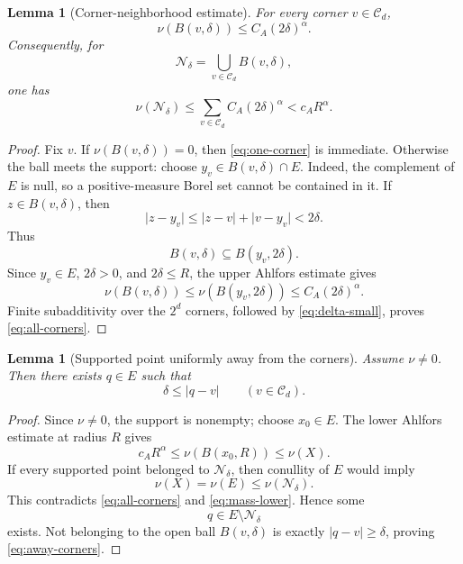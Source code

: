 \documentclass[11pt]{article}
\newtheorem{lemma}[theorem]{Lemma}
\theoremstyle{remark}
\newcommand{\Corners}{\mathcal C_d}
\begin{document}
\begin{lemma}[Corner-neighborhood estimate]                               \label{lem:corner-neighborhood}
For every corner \(v\in\Corners\),
\begin{equation}
  \nu(B(v,\delta))
  \leq
  C_A(2\delta)^\alpha.                                                     \label{eq:one-corner}
\end{equation}
Consequently, for
\[
  \mathcal N_\delta
  =
  \bigcup_{v\in\Corners}B(v,\delta),
\]
one has
\begin{equation}
  \nu(\mathcal N_\delta)
  \leq
  \sum_{v\in\Corners}C_A(2\delta)^\alpha
  <
  c_A R^\alpha.                                                           \label{eq:all-corners}
\end{equation}
\end{lemma}

\begin{proof}
Fix \(v\).  If \(\nu(B(v,\delta))=0\), then
\eqref{eq:one-corner} is immediate.  Otherwise the ball meets the support:
choose \(y_v\in B(v,\delta)\cap E\).  Indeed, the complement of \(E\) is
null, so a positive-measure Borel set cannot be contained in it.  If
\(z\in B(v,\delta)\), then
\[
  \lvert z-y_v\rvert
  \leq
  \lvert z-v\rvert+\lvert v-y_v\rvert
  <
  2\delta.
\]
Thus
\[
  B(v,\delta)\subseteq B(y_v,2\delta).
\]
Since \(y_v\in E\), \(2\delta>0\), and \(2\delta\leq R\), the upper
Ahlfors estimate gives
\[
  \nu(B(v,\delta))
  \leq
  \nu(B(y_v,2\delta))
  \leq
  C_A(2\delta)^\alpha.
\]
Finite subadditivity over the \(2^d\) corners, followed by
\eqref{eq:delta-small}, proves \eqref{eq:all-corners}.
\end{proof}

\begin{lemma}[Supported point uniformly away from the corners]            \label{lem:away-point}
Assume \(\nu\neq0\).  Then there exists \(q\in E\) such that
\begin{equation}
  \delta\leq\lvert q-v\rvert
  \qquad(v\in\Corners).                                                    \label{eq:away-corners}
\end{equation}
\end{lemma}

\begin{proof}
Since \(\nu\neq0\), the support is nonempty; choose \(x_0\in E\).  The
lower Ahlfors estimate at radius \(R\) gives
\begin{equation}
  c_A R^\alpha
  \leq
  \nu(B(x_0,R))
  \leq
  \nu(X).                                                                 \label{eq:mass-lower}
\end{equation}
If every supported point belonged to \(\mathcal N_\delta\), then conullity
of \(E\) would imply
\[
  \nu(X)=\nu(E)\leq\nu(\mathcal N_\delta).
\]
This contradicts \eqref{eq:all-corners} and
\eqref{eq:mass-lower}.  Hence some
\[
  q\in E\setminus\mathcal N_\delta
\]
exists.  Not belonging to the open ball \(B(v,\delta)\) is exactly
\(\lvert q-v\rvert\geq\delta\), proving
\eqref{eq:away-corners}.
\end{proof}
\end{document}
